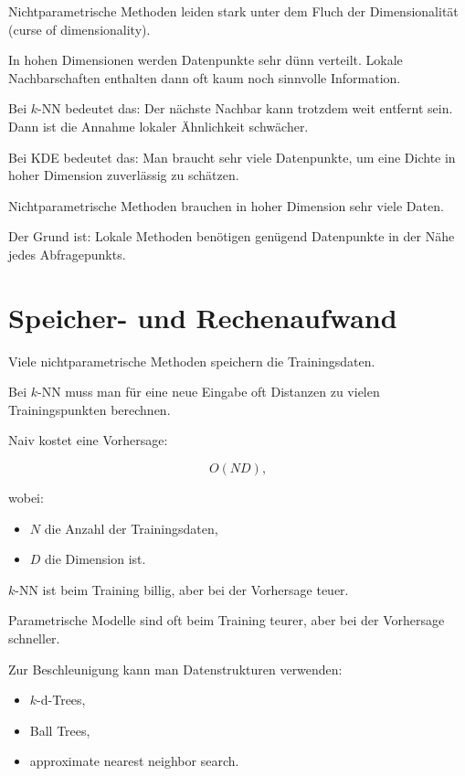 Nichtparametrische Methoden leiden stark unter dem Fluch der Dimensionalität (curse of dimensionality).

In hohen Dimensionen werden Datenpunkte sehr dünn verteilt.
Lokale Nachbarschaften enthalten dann oft kaum noch sinnvolle Information.

Bei \(k\)-NN bedeutet das:
Der nächste Nachbar kann trotzdem weit entfernt sein.
Dann ist die Annahme lokaler Ähnlichkeit schwächer.

Bei KDE bedeutet das:
Man braucht sehr viele Datenpunkte, um eine Dichte in hoher Dimension zuverlässig zu schätzen.

\begin{conceptbox}
Nichtparametrische Methoden brauchen in hoher Dimension sehr viele Daten.

Der Grund ist:
Lokale Methoden benötigen genügend Datenpunkte in der Nähe jedes Abfragepunkts.
\end{conceptbox}

\section{Speicher- und Rechenaufwand}

Viele nichtparametrische Methoden speichern die Trainingsdaten.

Bei \(k\)-NN muss man für eine neue Eingabe oft Distanzen zu vielen Trainingspunkten berechnen.

Naiv kostet eine Vorhersage:

\[
    O(ND),
\]

wobei:

\begin{itemize}
    \item \(N\) die Anzahl der Trainingsdaten,
    \item \(D\) die Dimension ist.
\end{itemize}

\begin{notebox}
\(k\)-NN ist beim Training billig, aber bei der Vorhersage teuer.

Parametrische Modelle sind oft beim Training teurer, aber bei der Vorhersage schneller.
\end{notebox}

Zur Beschleunigung kann man Datenstrukturen verwenden:

\begin{itemize}
    \item \(k\)-d-Trees,
    \item Ball Trees,
    \item approximate nearest neighbor search.
\end{itemize}

